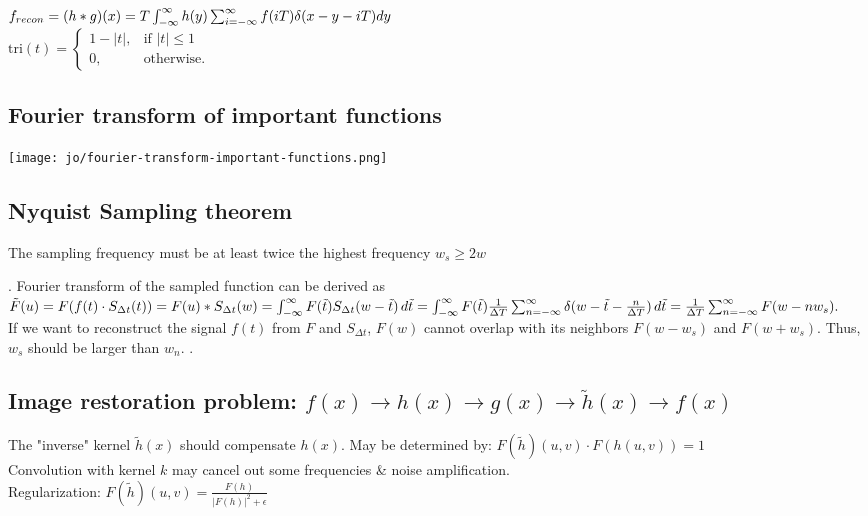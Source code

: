 $f_{recon} = (h*g)(x) =\\
T \int_{-\infty}^{\infty} h(y) \sum_{i = -\infty}^{\infty} f(iT) \delta(x-y-iT)dy$\\
$\text{tri}(t) = \begin{cases} 1 - |t|, & \text{if } |t| \leq 1 \\ 0, & \text{otherwise.} \end{cases}$

\subsection*{Fourier transform of important functions}
\texttt{[image: jo/fourier-transform-important-functions.png]}
\subsection*{Nyquist Sampling theorem}
The sampling frequency must be at least twice the highest frequency $w_s \geq 2 w$ 

 . Fourier transform of the sampled function can be derived as
$
\tilde{F}(u) = F(f(t) \cdot S_{\Delta t}(t)) \\
            = F(u) * S_{\Delta t}(w) \\
            = \int_{-\infty}^{\infty} F(\tilde{t}) S_{\Delta t}(w - \tilde{t}) \, d\tilde{t} \\
            = \int_{-\infty}^{\infty} F(\tilde{t}) \frac{1}{\Delta T} \sum_{n = -\infty}^{\infty} \delta (w - \tilde{t} - \frac{n}{\Delta T}) \, d\tilde{t} \\
            = \frac{1}{\Delta T} \sum_{n = -\infty}^{\infty} F(w - n w_s).
$\\
If we want to reconstruct the signal $f(t)$ from $F$ and $S_{\Delta t}$, $F(w)$ cannot overlap with its neighbors $F(w - w_s)$ and $F(w + w_s)$. Thus, $w_s$ should be larger than $w_n$. .
\subsection*{Image restoration problem: $f(x) \rightarrow h(x) \rightarrow g(x) \rightarrow \tilde{h}(x) \rightarrow f(x)$}
The "inverse" kernel $\tilde{h}(x)$ should compensate $h(x)$. May be determined by: $F(\tilde{h})(u, v) \cdot F(h(u, v)) = 1$\\
 Convolution with kernel $k$ may cancel out some frequencies \& noise amplification. \\
 Regularization: $F(\tilde{h})(u, v) = \frac{F(h)}{{|F(h)|}^{2} + \epsilon}$ 
